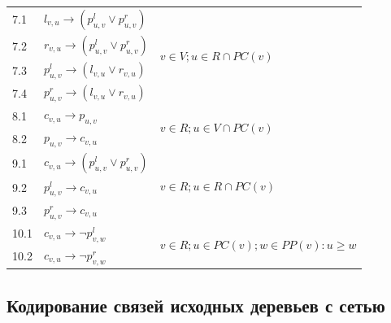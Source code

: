 \begin{table}[t]
\begin{tabular}{l | l | l}
  \hline
  7.1 &
  $l_{v,u} \rightarrow (p^l_{u,v} \vee p^r_{u,v})$ &
  \multirow{4}{*}{$v \in V; u \in R \cap PC(v)$}
  \\
  7.2 &
  $r_{v,u} \rightarrow (p^l_{u,v} \vee p^r_{u,v})$ &
  \\
  7.3 &
  $p^l_{u,v} \rightarrow (l_{v,u} \vee r_{v,u})$ &
  \\
  7.4 &
  $p^r_{u,v} \rightarrow (l_{v,u} \vee r_{v,u})$ &
  \\
  
  \hline 
  8.1 &
  $c_{v,u} \rightarrow p_{u,v}$ &
  \multirow{2}{*}{$v \in R; u \in V \cap PC(v)$}
  \\
  8.2 &
  $p_{u,v} \rightarrow c_{v,u}$ &
  \\
  
  \hline
  9.1 &
  $c_{v,u} \rightarrow (p^l_{u,v} \vee p^r_{u,v})$ &
  \multirow{3}{*}{$v \in R; u \in R \cap PC(v)$}
  \\
  9.2 &
  $p^l_{u,v} \rightarrow c_{v,u}$ &
  \\
  9.3 &
  $p^r_{u,v} \rightarrow c_{v,u}$ &
  \\
  
  \hline
  10.1\quad &
  $c_{v,u} \rightarrow \neg p^l_{v,w}$ &
  \multirow{2}{*}{$v \in R; u \in PC(v); w \in PP(v): u \geq w$}
  \\
  10.2 &
  $c_{v,u} \rightarrow \neg p^r_{v,w}$ &
  \\
  
\end{tabular}
\label{network-table}
\end{table}

\subsection{Кодирование связей исходных деревьев с сетью}

